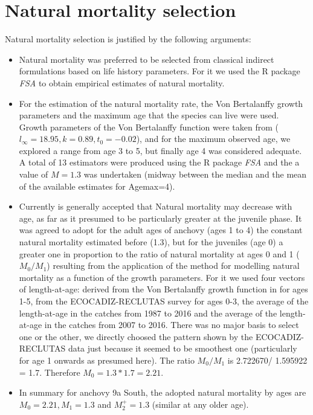 \documentclass[review]{elsarticle}
\begin{document}
\section{Natural mortality selection}

 Natural mortality selection is justified by the following arguments:
 \begin{itemize}
\item  Natural mortality was preferred to be selected from classical indirect formulations based on life history parameters. For it we used the R package \textit{FSA} to obtain empirical estimates of natural mortality.  
\item For the estimation of the  natural mortality rate, the Von Bertalanffy growth parameters and the maximum age that the species can live were used. Growth parameters of the Von Bertalanffy function were taken from \citet{Bellido2000} ($l_{\infty} =18.95, k =  0.89, t_{0} = -0.02$), and for the maximum observed age, we explored a range from age 3 to 5, but finally age 4 was considered adequate. A total of 13 estimators were produced using the R package \textit{FSA} and the a value of $M=1.3$ was undertaken (midway between the median and the mean of the available estimates for Agemax=4).  
\item Currently is generally accepted that Natural mortality may decrease with age, as far as it presumed to be particularly greater at the juvenile phase. It was agreed to adopt for the adult ages of anchovy (ages 1 to 4) the constant natural mortality estimated before (1.3), but for the juveniles (age 0) a greater one in proportion to the ratio of natural mortality at ages 0 and 1 ($M_{0}/M_{1}$) resulting from the application of the \citet{gislason2010size} method for modelling natural mortality as a function of the growth parameters.  For it we used four vectors of length-at-age: derived from the Von Bertalanffy growth function in \citet{Bellido2000} for ages 1-5, from the ECOCADIZ-RECLUTAS survey  for ages 0-3, the average of the length-at-age in the catches from 1987 to 2016 and the average of the length-at-age in the catches from 2007 to 2016. There was no major basis to select one or the other, we directly choosed the pattern shown by the ECOCADIZ-RECLUTAS data just because it seemed to be smoothest one (particularly for age 1 onwards as presumed here). The ratio $M_{0}/M_{1}$ is 2.722670/ 1.595922 = 1.7. Therefore $M_0=1.3*1.7= 2.21.$
\item In summary for anchovy 9a South, the adopted natural mortality by ages are $M_0=2.21, M_1=1.3$ and $M_2^+=1.3$ (similar at any older age).
\end{itemize}
\end{document}
